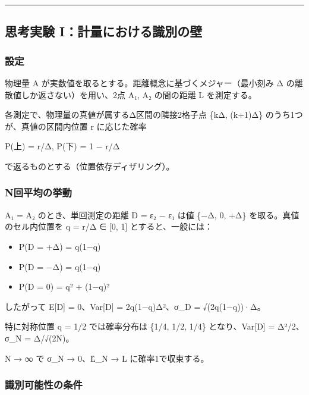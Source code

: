 \documentclass[
]{ltjsarticle}
\providecommand{\tightlist}{%
  \setlength{\itemsep}{0pt}\setlength{\parskip}{0pt}}
\begin{document}
\begin{center}\rule{0.5\linewidth}{0.5pt}\end{center}

\subsection{思考実験
I：計量における識別の壁}\label{ux601dux8003ux5b9fux9a13-iux8a08ux91cfux306bux304aux3051ux308bux8b58ux5225ux306eux58c1}

\subsubsection{設定}\label{ux8a2dux5b9a}

物理量 A が実数値を取るとする。距離概念に基づくメジャー（最小刻み Δ
の離散値しか返さない）を用い、2点 A₁, A₂ の間の距離 L を測定する。

各測定で、物理量の真値が属するΔ区間の隣接2格子点 \{kΔ, (k+1)Δ\}
のうち1つが、真値の区間内位置 r に応じた確率

P(上) = r/Δ, P(下) = 1 − r/Δ

で返るものとする（位置依存ディザリング）。

\subsubsection{N回平均の挙動}\label{nux56deux5e73ux5747ux306eux6319ux52d5}

A₁ = A₂ のとき、単回測定の距離 D = ε₂ − ε₁ は値 \{−Δ, 0, +Δ\}
を取る。真値のセル内位置を q = r/Δ ∈ {[}0, 1{]} とすると、一般には：

\begin{itemize}
\tightlist
\item
  P(D = +Δ) = q(1−q)
\item
  P(D = −Δ) = q(1−q)
\item
  P(D = 0) = q² + (1−q)²
\end{itemize}

したがって E{[}D{]} = 0、Var{[}D{]} = 2q(1−q)Δ²、σ\_D = √(2q(1−q))·Δ。

特に対称位置 q = 1/2 では確率分布は \{1/4, 1/2, 1/4\} となり、Var{[}D{]}
= Δ²/2、σ\_N = Δ/√(2N)。

N → ∞ で σ\_N → 0、L̂\_N → L に確率1で収束する。

\subsubsection{識別可能性の条件}\label{ux8b58ux5225ux53efux80fdux6027ux306eux6761ux4ef6}
\end{document}
